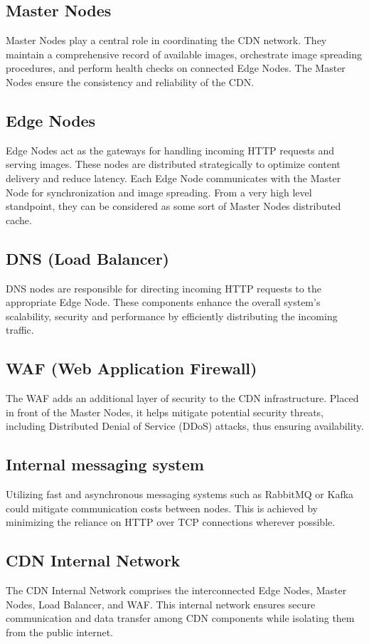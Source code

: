 \documentclass{article}
\begin{document}
  \subsection{Master Nodes}
  Master Nodes play a central role in coordinating the CDN network.
  They maintain a comprehensive record of available images, orchestrate image spreading procedures,
  and perform health checks on connected Edge Nodes. The Master Nodes ensure the consistency and reliability of the CDN.


  \subsection{Edge Nodes}
  Edge Nodes act as the gateways for handling incoming HTTP requests and serving images.
  These nodes are distributed strategically to optimize content delivery and reduce latency.
  Each Edge Node communicates with the Master Node for synchronization and image spreading.
  From a very high level standpoint, they can be considered as some sort of Master Nodes distributed cache.

  \subsection{DNS (Load Balancer)}
  DNS nodes are responsible for directing incoming HTTP requests to the appropriate Edge Node.
  These components enhance the overall system's scalability, security and performance by efficiently
  distributing the incoming traffic.

  \subsection{WAF (Web Application Firewall)}
  The WAF adds an additional layer of security to the CDN infrastructure.
  Placed in front of the Master Nodes, it helps mitigate potential security threats,
  including Distributed Denial of Service (DDoS) attacks, thus ensuring availability.

  \subsection{Internal messaging system}
  Utilizing fast and asynchronous messaging systems such as RabbitMQ or Kafka could mitigate
  communication costs between nodes. This is achieved by minimizing the reliance on HTTP over TCP connections
  wherever possible.

  \subsection{CDN Internal Network}
  The CDN Internal Network comprises the interconnected Edge Nodes, Master Nodes, Load Balancer, and WAF.
  This internal network ensures secure communication and data transfer among CDN components
  while isolating them from the public internet.
\end{document}
